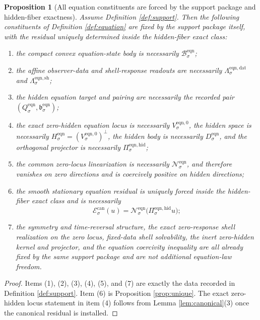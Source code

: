 \documentclass[11pt]{article}
\newcommand{\EqnBody}[1]{\mathcal B_{#1}^{\mathrm{eqn}}}
\newcommand{\EqnData}[1]{\Lambda_{#1}^{\mathrm{eqn,dat}}}
\newcommand{\EqnShell}[1]{\Lambda_{#1}^{\mathrm{eqn,sh}}}
\newcommand{\EqnTarget}[1]{Q_{#1}^{\mathrm{eqn}}}
\newcommand{\EqnPair}[1]{\mathfrak b_{#1}^{\mathrm{eqn}}}
\newcommand{\EqnResidualCan}[1]{\mathcal E_{#1}^{\mathrm{can}}}
\newcommand{\EqnZero}[1]{V_{#1}^{\mathrm{eqn},0}}
\newcommand{\EqnHidden}[1]{H_{#1}^{\mathrm{eqn}}}
\newcommand{\EqnHiddenBody}[1]{D_{#1}^{\mathrm{eqn}}}
\newcommand{\EqnProj}[1]{\Pi_{#1}^{\mathrm{eqn,hid}}}
\newcommand{\EqnLin}[1]{\mathcal N_{#1}^{\mathrm{eqn}}}
\newtheorem{proposition}{Proposition}
\begin{document}
\begin{proposition}[All equation constituents are forced by the support package and hidden-fiber exactness]
\label{prop:forced}
Assume Definition \ref{def:support}. Then the following constituents of Definition \ref{def:equation} are fixed by the support package itself, with the residual uniquely determined inside the hidden-fiber exact class:
\begin{enumerate}
    \item the compact convex equation-state body is necessarily \(\EqnBody{\sigma}\);
    \item the affine observer-data and shell-response readouts are necessarily \(\EqnData{\sigma}\) and \(\EqnShell{\sigma}\);
    \item the hidden equation target and pairing are necessarily the recorded pair \((\EqnTarget{\sigma},\EqnPair{\sigma})\);
    \item the exact zero-hidden equation locus is necessarily \(\EqnZero{\sigma}\), the hidden space is necessarily \(\EqnHidden{\sigma}=(\EqnZero{\sigma})^{\perp}\), the hidden body is necessarily \(\EqnHiddenBody{\sigma}\), and the orthogonal projector is necessarily \(\EqnProj{\sigma}\);
    \item the common zero-locus linearization is necessarily \(\EqnLin{\sigma}\), and therefore vanishes on zero directions and is coercively positive on hidden directions;
    \item the smooth stationary equation residual is uniquely forced inside the hidden-fiber exact class and is necessarily
    \[
    \EqnResidualCan{\sigma}(u)=\EqnLin{\sigma}\bigl(\EqnProj{\sigma}u\bigr);
    \]
    \item the symmetry and time-reversal structure, the exact zero-response shell realization on the zero locus, fixed-data shell solvability, the inert zero-hidden kernel and projector, and the equation coercivity inequality are all already fixed by the same support package and are not additional equation-law freedom.
\end{enumerate}
\end{proposition}

\begin{proof}
Items (1), (2), (3), (4), (5), and (7) are exactly the data recorded in Definition \ref{def:support}. Item (6) is Proposition \ref{prop:unique}. The exact zero-hidden locus statement in item (4) follows from Lemma \ref{lem:canonical}(3) once the canonical residual is installed.
\end{proof}
\end{document}
